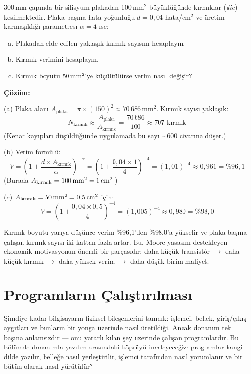 \begin{ornek}[1.4]
\label{orn:verim-hesaplama}
300\,mm çapında bir silisyum plakadan 100\,mm$^2$ büyüklüğünde kırmıklar (\emph{die}) kesilmektedir. Plaka başına hata yoğunluğu $d = 0{,}04$ hata/cm$^2$ ve üretim karmaşıklığı parametresi $\alpha = 4$ ise:
\begin{enumerate}[(a)]
\item Plakadan elde edilen yaklaşık kırmık sayısını hesaplayın.
\item Kırmık verimini hesaplayın.
\item Kırmık boyutu 50\,mm$^2$'ye küçültülürse verim nasıl değişir?
\end{enumerate}

\textbf{Çözüm:}

(a) Plaka alanı $A_{\text{plaka}} = \pi \times (150)^2 \approx 70\,686$\,mm$^2$. Kırmık sayısı yaklaşık:
\[
N_{\text{kırmık}} \approx \frac{A_{\text{plaka}}}{A_{\text{kırmık}}} = \frac{70\,686}{100} \approx 707 \text{ kırmık}
\]
(Kenar kayıpları düşüldüğünde uygulamada bu sayı $\sim$600 civarına düşer.)

(b) Verim formülü:
\[
V = \left(1 + \frac{d \times A_{\text{kırmık}}}{\alpha}\right)^{-\alpha} = \left(1 + \frac{0{,}04 \times 1}{4}\right)^{-4} = (1{,}01)^{-4} \approx 0{,}961 = \%96{,}1
\]
(Burada $A_{\text{kırmık}} = 100\text{\,mm}^2 = 1\text{\,cm}^2$.)

(c) $A_{\text{kırmık}} = 50\text{\,mm}^2 = 0{,}5\text{\,cm}^2$ için:
\[
V = \left(1 + \frac{0{,}04 \times 0{,}5}{4}\right)^{-4} = (1{,}005)^{-4} \approx 0{,}980 = \%98{,}0
\]

Kırmık boyutu yarıya düşünce verim \%96,1'den \%98,0'a yükselir ve plaka başına çalışan kırmık sayısı iki kattan fazla artar. Bu, Moore yasasını destekleyen ekonomik motivasyonun önemli bir parçasıdır: daha küçük transistör $\rightarrow$ daha küçük kırmık $\rightarrow$ daha yüksek verim $\rightarrow$ daha düşük birim maliyet.
\end{ornek}


\section{Programların Çalıştırılması}
\label{sec:program-calistirma}

Şimdiye kadar bilgisayarın fiziksel bileşenlerini tanıdık: işlemci, bellek, giriş/çıkış aygıtları ve bunların bir yonga üzerinde nasıl üretildiği. Ancak donanım tek başına anlamsızdır --- onu yararlı kılan şey üzerinde çalışan programlardır. Bu bölümde donanımla yazılım arasındaki köprüyü inceleyeceğiz: programlar hangi dilde yazılır, belleğe nasıl yerleştirilir, işlemci tarafından nasıl yorumlanır ve bir bütün olarak nasıl yürütülür?


